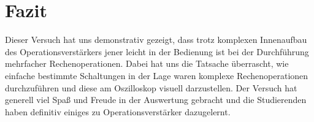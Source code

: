 

\chapter{Fazit}
\label{chap:fazit}

Dieser Versuch hat uns demonstrativ gezeigt, dass trotz komplexen Innenaufbau des Operationsverstärkers jener leicht in der Bedienung ist bei der Durchführung mehrfacher Rechenoperationen. Dabei hat uns die Tatsache überrascht, wie einfache bestimmte Schaltungen in der Lage waren komplexe Rechenoperationen durchzuführen und diese am Oszilloskop visuell darzustellen. Der Versuch hat generell viel Spaß und Freude in der Auswertung gebracht und die Studierenden haben definitiv einiges zu Operationsverstärker dazugelernt.
